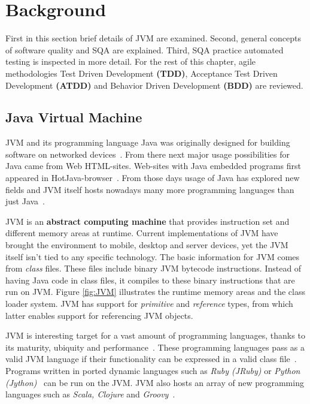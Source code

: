 \chapter{Background}
\label{chapter:background} 

First in this section brief details of JVM are examined.
Second, general concepts of software quality and SQA are explained.
Third, SQA practice automated testing is inspected in more detail.
For the rest of this chapter, agile methodologies Test Driven Development \textbf{(TDD)}, Acceptance Test Driven Development
\textbf{(ATDD)} and Behavior Driven Development \textbf{(BDD)} are reviewed.

\section{Java Virtual Machine} %
    JVM and its programming language Java was originally designed for building software on networked devices~\cite{lindholm2015java}. From there
    next major usage possibilities for Java came from Web HTML-sites. Web-sites with Java embedded programs first appeared in HotJava-browser~\cite{lindholm2015java}.
    From those days usage of Java has explored new fields and JVM itself hosts nowadays many more programming languages than
    just Java~\cite{wiki:jvm}.

    JVM is an \textbf{abstract computing machine} that provides instruction set and different memory areas at runtime.
    Current implementations of JVM have brought the environment to mobile, desktop and server devices, yet the JVM itself
    isn't tied to any specific technology. The basic information for JVM comes from \textit{class} files. These files include
    binary JVM bytecode instructions. Instead of having Java code in class files, it compiles to these binary instructions
    that are run on JVM. Figure \ref{fig:JVM} illustrates the runtime memory areas and the class loader system.
    JVM has support for \textit{primitive} and \textit{reference} types, from which latter enables support for referencing JVM objects. ~\cite{lindholm2015java}

    JVM is interesting target for a vast amount of programming languages, thanks to its maturity, ubiquity and performance~\cite{sarimbekov2013characteristics}.
    These programming languages pass as a valid JVM language if their functionality can be expressed in a valid class file~\cite{wiki:jvm}.
    Programs written in ported dynamic languages such as \textit{Ruby (JRuby)} or \textit{Python (Jython)}~\cite{sarimbekov2013characteristics} can be run on the JVM.
    JVM also hosts an array of new programming languages such as \textit{Scala, Clojure} and \textit{Groovy}~\cite{wiki:jvm}.

